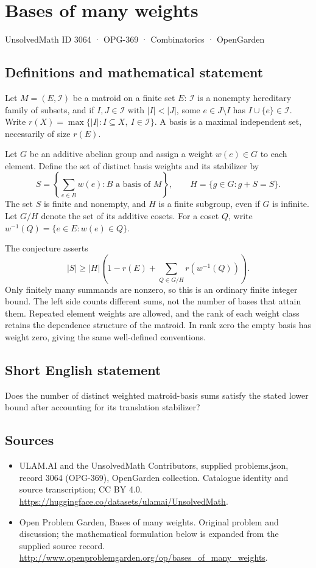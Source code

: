 \documentclass[11pt,a4paper]{article}
\begin{document}
\section*{Bases of many weights}\label{3064}
{\small UnsolvedMath ID 3064 · OPG-369 · Combinatorics · OpenGarden}
\subsection{Definitions and mathematical statement}
Let $M=(E,\mathcal I)$ be a matroid on a finite set $E$: $\mathcal I$ is
a nonempty hereditary family of subsets, and if $I,J\in\mathcal I$ with
$|I|<|J|$, some $e\in J\setminus I$ has $I\cup\{e\}\in\mathcal I$.
Write $r(X)=\max\{|I|:I\subseteq X,\ I\in\mathcal I\}$.
A basis is a maximal independent set, necessarily of size $r(E)$.

Let $G$ be an additive abelian group and assign a weight $w(e)\in G$
to each element. Define the set of distinct basis weights and its stabilizer by
\[
 S=\left\{\sum_{e\in B}w(e):B\text{ a basis of }M\right\},\qquad
 H=\{g\in G:g+S=S\}.
\]
The set $S$ is finite and nonempty, and $H$ is a finite subgroup, even
if $G$ is infinite. Let $G/H$ denote the set of its additive cosets.
For a coset $Q$, write $w^{-1}(Q)=\{e\in E:w(e)\in Q\}$.

The conjecture asserts
\[
 |S|\ge |H|\left(1-r(E)+
                 \sum_{Q\in G/H}r(w^{-1}(Q))\right).
\]
Only finitely many summands are nonzero, so this is an ordinary finite
integer bound. The left side counts different sums, not the number of
bases that attain them. Repeated element weights are allowed, and the
rank of each weight class retains the dependence structure of the
matroid. In rank zero the empty basis has weight zero, giving the same
well-defined conventions.
\subsection{Short English statement}
Does the number of distinct weighted matroid-basis sums satisfy the stated lower bound after accounting for its translation stabilizer?
\subsection{Sources}
\begin{itemize}
\item[S1] ULAM.AI and the UnsolvedMath Contributors, supplied problems.json, record 3064 (OPG-369), OpenGarden collection. Catalogue identity and source transcription; CC BY 4.0.
\url{https://huggingface.co/datasets/ulamai/UnsolvedMath}.
\item[S2] Open Problem Garden, Bases of many weights. Original problem and discussion; the mathematical formulation below is expanded from the supplied source record.
\url{http://www.openproblemgarden.org/op/bases_of_many_weights}.
\end{itemize}
\end{document}
